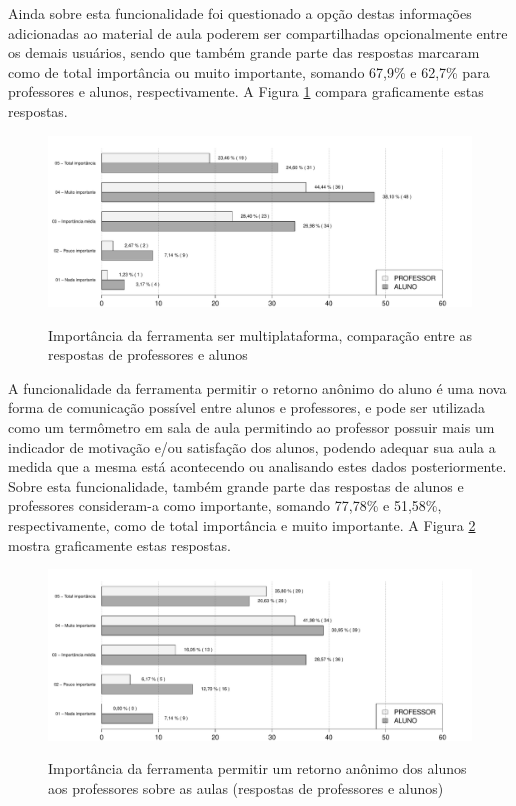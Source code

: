 Ainda sobre esta funcionalidade foi questionado a opção destas informações adicionadas ao material de aula poderem ser compartilhadas opcionalmente entre os demais usuários, sendo que também grande parte das respostas marcaram como de total importância ou muito importante, somando 67,9\% e 62,7\% para professores e alunos, respectivamente. A Figura \ref{fig:grafico_compartilhar_anotacoes} compara graficamente estas respostas.


\begin{figure}
\centering
\caption{Importância da ferramenta ser multiplataforma, comparação entre as respostas de professores e alunos}
\includegraphics[width=1.0\textwidth]{pdfs/alunos-professores/funcionalidades-compar-anotacoes.pdf} 
\label{fig:grafico_compartilhar_anotacoes} 
\end{figure}

A funcionalidade da ferramenta permitir o retorno anônimo do aluno é uma nova forma de comunicação possível entre alunos e professores, e pode ser utilizada como um termômetro em sala de aula permitindo ao professor possuir mais um indicador de motivação e/ou satisfação dos alunos, podendo adequar sua aula a medida que a mesma está acontecendo ou analisando estes dados posteriormente. Sobre esta funcionalidade, também grande parte das respostas de alunos e professores consideram-a como importante, somando 77,78\% e 51,58\%, respectivamente, como de total importância e muito importante. A Figura \ref{fig:grafico_retorno} mostra graficamente estas respostas.

\begin{figure}
\centering
\caption{Importância da ferramenta permitir um retorno anônimo dos alunos aos professores sobre as aulas (respostas de professores e alunos)}
\includegraphics[width=1.0\textwidth]{pdfs/alunos-professores/funcionalidades-retorno.pdf} 
\label{fig:grafico_retorno} 
\end{figure}



